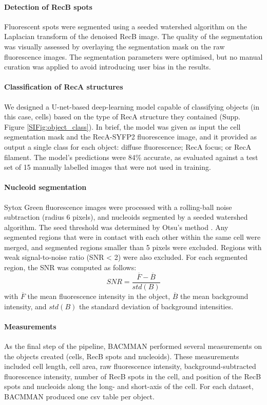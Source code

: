 \paragraph*{Detection of RecB spots}
Fluorescent spots were seg\-men\-ted using a seeded watershed algorithm on the Laplacian transform of the denoised RecB image. The quality of the segmentation was visually assessed by overlaying the segmentation mask on the raw fluorescence images. The segmentation parameters were optimised, but no manual curation was applied to avoid introducing user bias in the results.

\paragraph*{Classification of RecA structures}
We designed a U-net-based deep-learning model capable of classifying objects (in this case, cells) based on the type of RecA structure they contained (Supp. Figure \ref{SIFig:object_class}). In brief, the model was given as input the cell segmentation mask and the RecA-SYFP2 fluorescence image, and it provided as output a single class for each object: diffuse fluorescence; RecA focus; or RecA filament. The model's predictions were 84\% accurate, as evaluated against a test set of 15 manually labelled images that were not used in training.

\paragraph*{Nucleoid segmentation}
Sytox Green fluorescence images were processed with a rolling-ball noise subtraction (radius 6 pixels), and nucleoids segmented by a seeded watershed algorithm. The seed threshold was determined by Otsu's method \cite{Otsu1979}. Any segmented regions that were in contact with each other within the same cell were merged, and segmented regions smaller than 5 pixels were excluded. Regions with weak signal-to-noise ratio (SNR < 2) were also excluded. For each segmented region, the SNR was computed as follows:
\begin{equation}
    SNR = \dfrac{\overline{F}-\overline{B}}{std(B)}
\end{equation}
with $\overline{F}$ the mean fluorescence intensity in the object, $\overline{B}$ the mean background intensity, and $std(B)$ the standard deviation of background intensities.

\paragraph*{Measurements}
As the final step of the pipeline, BACMMAN performed several measurements on the objects created (cells, RecB spots and nucleoids). These measurements included cell length, cell area, raw fluorescence intensity, background-subtracted fluorescence intensity, number of RecB spots in the cell, and position of the RecB spots and nucleoids along the long- and short-axis of the cell. For each dataset, BACMMAN produced one csv table per object.

